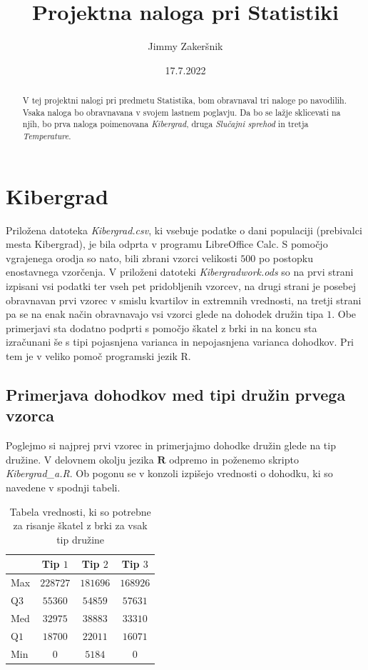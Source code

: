 \documentclass[a4paper, 10pt]{article}
\title{Projektna naloga pri Statistiki}
\date{17.7.2022}
\author{Jimmy Zakeršnik}
\newcommand{\pojem}[1]{\emph{#1}}
\begin{document}
	\maketitle
	\thispagestyle{empty}
	\newpage
	\begin{abstract}
		V tej projektni nalogi pri predmetu Statistika, bom obravnaval tri naloge po navodilih. Vsaka naloga bo obravnavana v svojem lastnem poglavju. Da bo se lažje sklicevati na njih, bo prva naloga poimenovana \pojem{Kibergrad}, druga \pojem{Slučajni sprehod} in tretja \pojem{Temperature}.
	\end{abstract}
	\newpage
	\tableofcontents
	\newpage
	\section{Kibergrad}\label{sect: Kibergrad}
	Priložena datoteka \textit{Kibergrad.csv}, ki vsebuje podatke o dani populaciji (prebivalci mesta Kibergrad), je bila odprta v programu LibreOffice Calc. S pomočjo vgrajenega orodja so nato, bili zbrani vzorci velikosti $500$ po postopku enostavnega vzorčenja. V priloženi datoteki \textit{Kibergradwork.ods} so na prvi strani izpisani vsi podatki ter vseh pet pridobljenih vzorcev, na drugi strani je posebej obravnavan prvi vzorec v smislu kvartilov in extremnih vrednosti, na tretji strani pa se na enak način obravnavajo vsi vzorci glede na dohodek družin tipa $1$. Obe primerjavi sta dodatno podprti s pomočjo škatel z brki in na koncu sta izračunani še s tipi pojasnjena varianca in nepojasnjena varianca dohodkov. Pri tem je v veliko pomoč programski jezik R.
	
	\subsection{Primerjava dohodkov med tipi družin prvega vzorca} \label{subsect: 1A}
	Poglejmo si najprej prvi vzorec in primerjajmo dohodke družin glede na tip družine. V delovnem okolju jezika $\textbf{R}$ odpremo in poženemo skripto \textit{Kibergrad\_a.R}. Ob pogonu se v konzoli izpišejo vrednosti o dohodku, ki so navedene v spodnji tabeli.
	\begin{table}[h!]
		\label{tab: quartA}
		\centering
		\begin{tabular}{|l|c|c|c|}
			\hline
			& Tip $1$ & Tip $2$ & Tip $3$ \\ \hline
			Max & $228727$ & $181696$ & $168926$ \\ \hline
			Q$3$ & $55360$ & $54859$ & $57631$ \\ \hline
			Med & $32975$ & $38883$ & $33310$ \\ \hline
			Q$1$ & $18700$ & $22011$ & $16071$ \\ \hline
			Min & $0$ & $5184$ & $0$ \\ \hline
		\end{tabular}
	\caption{Tabela vrednosti, ki so potrebne za risanje škatel z brki za vsak tip družine}
	\end{table}
\end{document}

